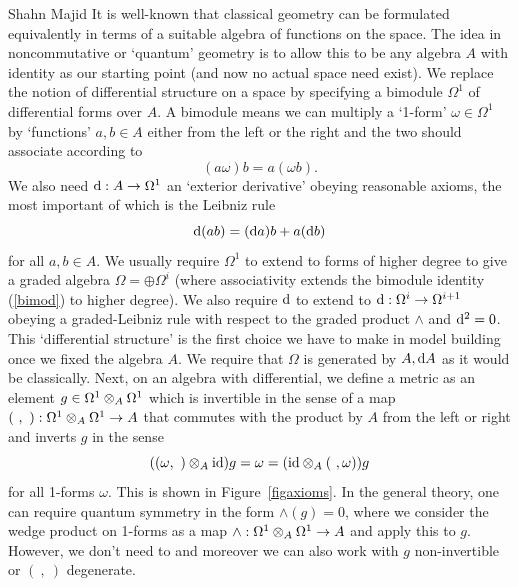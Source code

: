 \begin{artengenv}{Shahn Majid}
It is well-known that classical geometry can be formulated equivalently in terms of a suitable algebra of functions on the space. The idea in noncommutative or `quantum' geometry is to allow this to be any algebra $A$ with identity as our starting point (and now no actual space need exist). We replace the notion of differential structure on a space by specifying a bimodule $\Omega^1$ of differential forms over $A$. A bimodule means we can multiply a `1-form' $\omega\in\Omega^1$ by `functions' $a,b\in A$ either from the left or the right and the two should associate according to 
\begin{equation}\label{bimod} (a\omega)b=a(\omega b).\end{equation}
We also need ${\rm d}:A\to \Omega^1$ an `exterior derivative' obeying reasonable axioms, the most important of which is the Leibniz rule 
\begin{equation}\label{leib} \extd(ab)=(\extd a)b+ a(\extd b)\end{equation}
for all $a,b\in A$. We usually require $\Omega^1$ to extend to forms of higher degree to give a graded algebra $\Omega=\oplus\Omega^i$ (where associativity extends the bimodule identity (\ref{bimod}) to higher degree). We also require ${\rm d}$ to extend to ${\rm d}:\Omega^i\to \Omega^{i+1}$ obeying a graded-Leibniz rule with respect to the graded product $\wedge$ and ${\rm d}^2=0$. This `differential structure' is the first choice we have to make in model building once we fixed the algebra $A$. We require that $\Omega$ is generated by $A,{\rm d} A$ as it would be classically. 
Next, on an algebra with differential, we define a metric as an element $g\in \Omega^1\otimes_A\Omega^1$ which is invertible in the sense of a map $(\ ,\ ):\Omega^1\otimes_A\Omega^1\to A$ that commutes with the product by $A$ from the left or right and inverts $g$ in the sense
\begin{equation}\label{metricinv}((\omega,\ )\tens_A\id)g=\omega=(\id\tens_A(\ ,\omega))g\end{equation}
 for all 1-forms $\omega$. This is shown in Figure~\ref{figaxioms}. In the general theory, one can require quantum symmetry in the form $\wedge(g)=0$, where we consider the wedge product on 1-forms as a map $\wedge:\Omega^1\otimes_A\Omega^1\to A$ and apply this to $g$. However, we don't need to and moreover we can also work with $g$ non-invertible or $(\ ,\ )$ degenerate. 
 

\end{artengenv}
